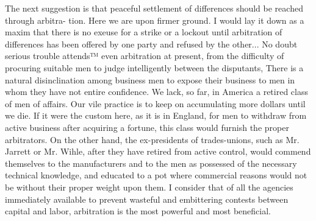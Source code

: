 \documentclass[11pt,openany]{book}
\begin{document}
The next suggestion is that peaceful settlement of differences should be reached through arbitra- tion. Here we are upon firmer ground. I would lay it down as a maxim that there is no exeuse for a strike or a lockout until arbitration of differences has been offered by one party and refused by the other... No doubt serious trouble attends™ even arbitration at present, from the difficulty of procuring suitable men to judge intelligently between the disputants, There is a natural disinclination among business men to expose their business to men in whom they have not entire confidence. We lack, so far, in America a retired class of men of affairs. Our vile practice is to keep on accumulating more dollars until we die. If it were the custom here, as it is in England, for men to withdraw from active business after acquiring a fortune, this class would furnish the proper arbitrators. On the other hand, the ex-presidents of trades-unions, such as Mr. Jarrett or Mr. Wihle, after they have retired from active control, would commend themselves to the manufacturers and to the men as possessed of the necessary technical knowledge, and educated to a pot where commercial reasons would not be without their proper weight upon them. I consider that of all the agencies immediately available to prevent wasteful and embittering contests between capital and labor, arbitration is the most powerful and most beneficial.
\end{document}
